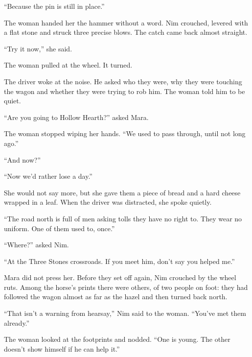 \documentclass[10pt,a4paper]{article}
\begin{document}
“Because the pin is still in place.”

The woman handed her the hammer without a word. Nim crouched, levered with a flat stone and struck three precise blows. The catch came back almost straight.

“Try it now,” she said.

The woman pulled at the wheel. It turned.

The driver woke at the noise. He asked who they were, why they were touching the wagon and whether they were trying to rob him. The woman told him to be quiet.

“Are you going to Hollow Hearth?” asked Mara.

The woman stopped wiping her hands. “We used to pass through, until not long ago.”

“And now?”

“Now we'd rather lose a day.”

She would not say more, but she gave them a piece of bread and a hard cheese wrapped in a leaf. When the driver was distracted, she spoke quietly.

“The road north is full of men asking tolls they have no right to. They wear no uniform. One of them used to, once.”

“Where?” asked Nim.

“At the Three Stones crossroads. If you meet him, don't say you helped me.”

Mara did not press her. Before they set off again, Nim crouched by the wheel ruts. Among the horse's prints there were others, of two people on foot: they had followed the wagon almost as far as the hazel and then turned back north.

“That isn't a warning from hearsay,” Nim said to the woman. “You've met them already.”

The woman looked at the footprints and nodded. “One is young. The other doesn't show himself if he can help it.”
\end{document}
